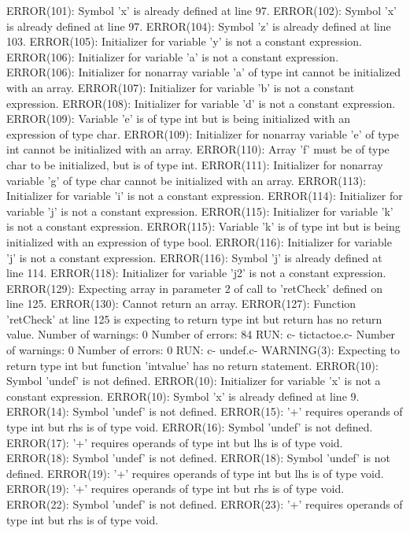 \documentclass[12pt]{book}
\begin{document}
ERROR(101): Symbol 'x' is already defined at line 97.
ERROR(102): Symbol 'x' is already defined at line 97.
ERROR(104): Symbol 'z' is already defined at line 103.
ERROR(105): Initializer for variable 'y' is not a constant expression.
ERROR(106): Initializer for variable 'a' is not a constant expression.
ERROR(106): Initializer for nonarray variable 'a' of type int cannot be initialized with an array.
ERROR(107): Initializer for variable 'b' is not a constant expression.
ERROR(108): Initializer for variable 'd' is not a constant expression.
ERROR(109): Variable 'e' is of type int but is being initialized with an expression of type char.
ERROR(109): Initializer for nonarray variable 'e' of type int cannot be initialized with an array.
ERROR(110): Array 'f' must be of type char to be initialized, but is of type int.
ERROR(111): Initializer for nonarray variable 'g' of type char cannot be initialized with an array.
ERROR(113): Initializer for variable 'i' is not a constant expression.
ERROR(114): Initializer for variable 'j' is not a constant expression.
ERROR(115): Initializer for variable 'k' is not a constant expression.
ERROR(115): Variable 'k' is of type int but is being initialized with an expression of type bool.
ERROR(116): Initializer for variable 'j' is not a constant expression.
ERROR(116): Symbol 'j' is already defined at line 114.
ERROR(118): Initializer for variable 'j2' is not a constant expression.
ERROR(129): Expecting array in parameter 2 of call to 'retCheck' defined on line 125.
ERROR(130): Cannot return an array.
ERROR(127): Function 'retCheck' at line 125 is expecting to return type int but return has no return value.
Number of warnings: 0
Number of errors: 84
RUN: c- tictactoe.c-
Number of warnings: 0
Number of errors: 0
RUN: c- undef.c-
WARNING(3): Expecting to return type int but function 'intvalue' has no return statement.
ERROR(10): Symbol 'undef' is not defined.
ERROR(10): Initializer for variable 'x' is not a constant expression.
ERROR(10): Symbol 'x' is already defined at line 9.
ERROR(14): Symbol 'undef' is not defined.
ERROR(15): '+' requires operands of type int but rhs is of type void.
ERROR(16): Symbol 'undef' is not defined.
ERROR(17): '+' requires operands of type int but lhs is of type void.
ERROR(18): Symbol 'undef' is not defined.
ERROR(18): Symbol 'undef' is not defined.
ERROR(19): '+' requires operands of type int but lhs is of type void.
ERROR(19): '+' requires operands of type int but rhs is of type void.
ERROR(22): Symbol 'undef' is not defined.
ERROR(23): '+' requires operands of type int but rhs is of type void.
\end{document}
